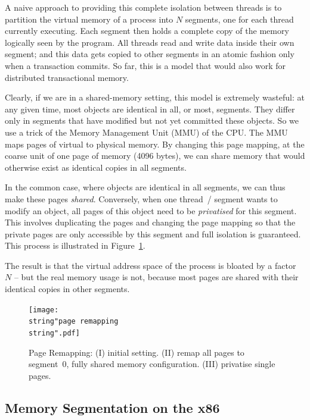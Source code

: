 \documentclass{sigplanconf}
\begin{document}
A naive approach to providing this complete isolation between threads
is to partition the virtual memory of a process into $N$ segments, one
for each thread currently executing.  Each segment then holds a
complete copy of the memory logically seen by the program.  All
threads read and write data inside their own segment; and this data
gets copied to other segments in an atomic fashion only when a
transaction commits.  So far, this is a model that would also work for
distributed transactional memory.

Clearly, if we are in a shared-memory setting, this model is extremely
wasteful: at any given time, most objects are identical in all, or
most, segments.  They differ only in segments that have modified but
not yet committed these objects.  So we use a trick of the Memory
Management Unit (MMU) of the CPU.  The MMU maps pages of virtual to
physical memory.  By changing this page mapping, at the coarse unit of
one page of memory (4096 bytes), we can share memory that would
otherwise exist as identical copies in all segments.

In the common case, where objects are identical in all segments, we
can thus make these pages \emph{shared}. Conversely, when one thread~/
segment wants to modify an object, all pages of this object need to be
\emph{privatised} for this segment. This involves duplicating the
pages and changing the page mapping so that the private pages are only
accessible by this segment and full isolation is guaranteed.  This
process is illustrated in Figure~\ref{fig:Page-Remapping}.

The result is that the virtual address space of the process is bloated
by a factor $N$ -- but the real memory usage is not, because most
pages are shared with their identical copies in other segments.

\begin{figure}[h]
  \centering
  \texttt{[image: \\string"page remapping\\string".pdf]}
  \caption{Page Remapping: (I) initial setting. (II) remap all pages to
    segment~0, fully shared memory configuration. (III) privatise single
    pages.\label{fig:Page-Remapping}}
\end{figure}


\subsection{Memory Segmentation on the x86}
\end{document}
